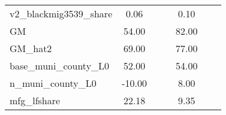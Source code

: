 \begin{table}[htbp]
\begin{tabular}{l*{2}{ccc}}
v2\_blackmig3539\_share&        0.06&            &            &        0.10&            &            \\
GM                  &       54.00&            &            &       82.00&            &            \\
GM\_hat2             &       69.00&            &            &       77.00&            &            \\
base\_muni\_county\_L0 &       52.00&            &            &       54.00&            &            \\
n\_muni\_county\_L0    &      -10.00&            &            &        8.00&            &            \\
mfg\_lfshare         &       22.18&            &            &        9.35&            &            \\
\bottomrule
\end{tabular}
\end{table}
